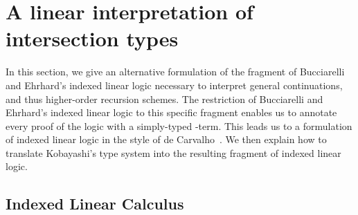 \documentclass{eptcs}
\begin{document}
\section{A linear interpretation of intersection types}
\label{section/linear-interpretation}
In this section, we give an alternative formulation of the fragment of Bucciarelli and Ehrhard's indexed linear logic
necessary to interpret general continuations, and thus higher-order recursion schemes.
The restriction of Bucciarelli and Ehrhard's indexed linear logic \cite{ill1,ill2} to this specific fragment
enables us to annotate every proof of the logic with a simply-typed -term.
This leads us to a formulation of indexed linear logic in the style of de Carvalho~\cite{carvalho}.
We then explain how to translate Kobayashi's type system into the resulting fragment
of indexed linear logic.

\subsection{Indexed Linear Calculus}
\end{document}
